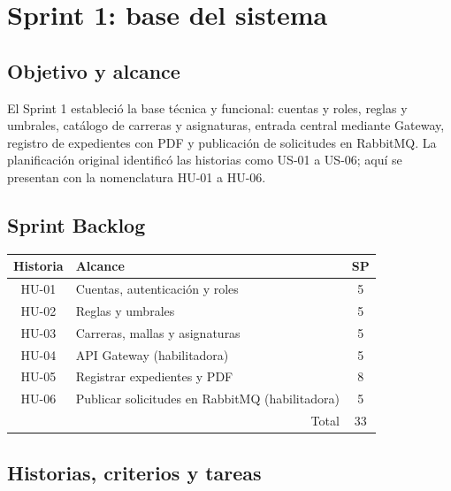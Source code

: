 \section{Sprint 1: base del sistema}
\subsection{Objetivo y alcance}
El Sprint 1 estableció la base técnica y funcional: cuentas y roles, reglas y umbrales, catálogo de carreras y asignaturas, entrada central mediante Gateway, registro de expedientes con PDF y publicación de solicitudes en RabbitMQ. La planificación original identificó las historias como US-01 a US-06; aquí se presentan con la nomenclatura HU-01 a HU-06.

\subsection{Sprint Backlog}
\begin{tabularx}{\textwidth}{|c|X|c|}\hline
\rowcolor{grisTarjeta}\textbf{Historia} & \textbf{Alcance} & \textbf{SP}\\\hline
HU-01 & Cuentas, autenticación y roles & 5\\\hline
HU-02 & Reglas y umbrales & 5\\\hline
HU-03 & Carreras, mallas y asignaturas & 5\\\hline
HU-04 & API Gateway (habilitadora) & 5\\\hline
HU-05 & Registrar expedientes y PDF & 8\\\hline
HU-06 & Publicar solicitudes en RabbitMQ (habilitadora) & 5\\\hline
\multicolumn{2}{|r|}{Total} & 33\\\hline
\end{tabularx}

\subsection{Historias, criterios y tareas}
